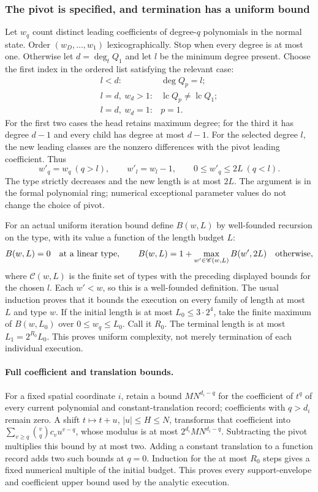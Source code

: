 \documentclass[11pt]{article}
\theoremstyle{definition}
\begin{document}
\subsubsection{The pivot is specified, and termination has a uniform bound}
Let $w_q$ count distinct leading coefficients of degree-$q$ polynomials in the normal state.
Order $(w_D,\ldots,w_1)$ lexicographically.  Stop when every degree is at most one.
Otherwise let $d=\deg_tQ_1$ and let $l$ be the minimum degree present.  Choose the first
index in the ordered list satisfying the relevant case:
\[
 \begin{array}{ll}
 l<d:&\deg Q_p=l;\\
 l=d,\ w_d>1:&\operatorname{lc}Q_p\ne\operatorname{lc}Q_1;\\
 l=d,\ w_d=1:&p=1.
 \end{array}
\]
For the first two cases the head retains maximum degree; for the third it has degree $d-1$
and every child has degree at most $d-1$.  For the selected degree $l$, the new leading
classes are the nonzero differences with the pivot leading coefficient.  Thus
\[
 w'_q=w_q\ (q>l),\qquad w'_l=w_l-1,\qquad 0\leq w'_q\leq2L\ (q<l).
\]
The type strictly decreases and the new length is at most $2L$.
The argument is in the formal polynomial ring; numerical exceptional parameter values do
not change the choice of pivot.

For an actual uniform iteration bound define $B(w,L)$ by well-founded recursion on the type,
with its value a function of the length budget $L$:
\[
 B(w,L)=0\quad\hbox{at a linear type},\qquad
 B(w,L)=1+\max_{w'\in\mathscr C(w,L)}B(w',2L)\quad\hbox{otherwise},
\]
where $\mathscr C(w,L)$ is the finite set of types with the preceding displayed bounds for
the chosen $l$.  Each $w'<w$, so this is a well-founded definition.  The usual induction
proves that it bounds the execution on every family of length at most $L$ and type $w$.
If the initial length is at most $L_0\leq3\cdot2^4$, take the finite maximum of $B(w,L_0)$
over $0\leq w_q\leq L_0$.  Call it $R_0$.  The terminal length is at most $L_1=2^{R_0}L_0$.
This proves uniform complexity, not merely termination of each individual execution.

\paragraph{Full coefficient and translation bounds.}
For a fixed spatial coordinate $i$, retain a bound $M N^{d_i-q}$ for the coefficient of
$t^q$ of every current polynomial and constant-translation record; coefficients with
$q>d_i$ remain zero.  A shift $t\mapsto t+u$, $|u|\leq H\leq N$, transforms that
coefficient into $\sum_{v\geq q}\binom vq c_v u^{v-q}$, whose modulus is at most
$2^{d_i}M N^{d_i-q}$.  Subtracting the pivot multiplies this bound by at most two.
Adding a constant translation to a function record adds two such bounds at $q=0$.
Induction for the at most $R_0$ steps gives a fixed numerical multiple of the initial budget.
This proves every support-envelope and coefficient upper bound used by the analytic execution.
\end{document}

